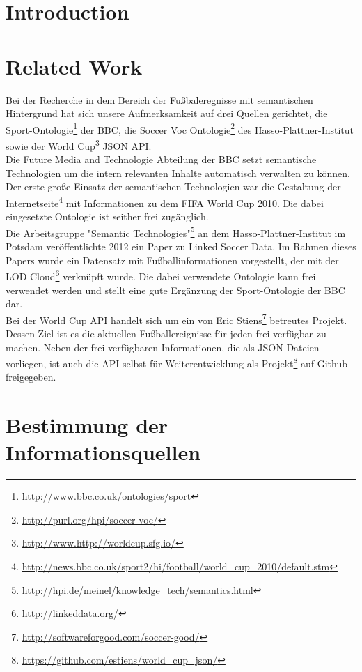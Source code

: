 \documentclass[runningheads,a4paper]{llncs}
\begin{document}
\section{Introduction}

\section{Related Work}

Bei der Recherche in dem Bereich der Fußbaleregnisse mit semantischen Hintergrund hat sich unsere Aufmerksamkeit auf drei Quellen gerichtet, die Sport-Ontologie\footnote{\url{http://www.bbc.co.uk/ontologies/sport}} der BBC, die Soccer Voc Ontologie\footnote{\url{http://purl.org/hpi/soccer-voc/}} des Hasso-Plattner-Institut sowie der World Cup\footnote{\url{http://www.http://worldcup.sfg.io/}} JSON API.\\ Die Future Media and Technologie Abteilung der BBC setzt semantische Technologien um die intern relevanten Inhalte automatisch verwalten zu können. Der erste große Einsatz der semantischen Technologien war die Gestaltung der Internetseite\footnote{\url{http://news.bbc.co.uk/sport2/hi/football/world_cup_2010/default.stm}} mit Informationen zu dem FIFA World Cup 2010. Die dabei eingesetzte Ontologie ist seither frei zugänglich. \\
Die Arbeitsgruppe "Semantic Technologies"\footnote{\url{http://hpi.de/meinel/knowledge_tech/semantics.html}} an dem Hasso-Plattner-Institut im Potsdam veröffentlichte 2012 ein Paper zu Linked Soccer Data\cite{url_lsd}. Im Rahmen dieses Papers wurde ein Datensatz mit Fußballinformationen vorgestellt, der mit der LOD Cloud\footnote{\url{http://linkeddata.org/}} verknüpft wurde. Die dabei verwendete Ontologie kann frei verwendet werden und stellt eine gute Ergänzung der Sport-Ontologie der BBC dar.\\
Bei der World Cup API handelt sich um ein von Eric Stiens\footnote{\url{http://softwareforgood.com/soccer-good/}} betreutes Projekt. Dessen Ziel ist es die aktuellen Fußballereignisse für jeden frei verfügbar zu machen. Neben der frei verfügbaren Informationen, die als JSON Dateien vorliegen, ist auch die API selbst für Weiterentwicklung als Projekt\footnote{\url{https://github.com/estiens/world_cup_json/}} auf Github freigegeben. 

\newpage
\section{Bestimmung der Informationsquellen}\label{infoQuell}
\end{document}
